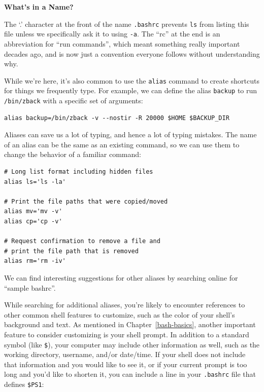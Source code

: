\documentclass[
]{krantz}
\renewenvironment{quote}{\begin{VF}}{\end{VF}}
\begin{document}
\begin{quote}
\textbf{What's in a Name?}

The `.' character at the front of the name \texttt{.bashrc}
prevents \texttt{ls} from listing this file
unless we specifically ask it to using \texttt{-a}.
The ``rc'' at the end is an abbreviation for ``run commands'',
which meant something really important decades ago,
and is now just a convention everyone follows without understanding why.
\end{quote}

While we're here,
it's also common to use the \texttt{alias} command
to create shortcuts for things we frequently type.
For example,
we can define the alias \texttt{backup}
to run \texttt{/bin/zback} with a specific set of arguments:

\begin{verbatim}
alias backup=/bin/zback -v --nostir -R 20000 $HOME $BACKUP_DIR
\end{verbatim}

Aliases can save us a lot of typing, and hence a lot of typing mistakes.
The name of an alias can be the same as an existing command,
so we can use them to change the behavior of a familiar command:

\begin{verbatim}
# Long list format including hidden files
alias ls='ls -la'

# Print the file paths that were copied/moved
alias mv='mv -v'
alias cp='cp -v'

# Request confirmation to remove a file and
# print the file path that is removed
alias rm='rm -iv'
\end{verbatim}

We can find interesting suggestions for other aliases
by searching online for ``sample bashrc''.

While searching for additional aliases,
you're likely to encounter references to other common shell features to customize,
such as the color of your shell's background and text.
As mentioned in Chapter~\ref{bash-basics},
another important feature to consider customizing is your shell prompt.
In addition to a standard symbol (like \texttt{\$}),
your computer may include other information as well,
such as the working directory, username, and/or date/time.
If your shell does not include that information and you would like to see it,
or if your current prompt is too long and you'd like to shorten it,
you can include a line in your \texttt{.bashrc} file that defines \texttt{\$PS1}:
\end{document}
